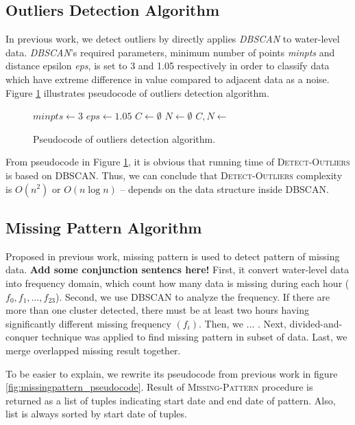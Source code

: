 \documentclass[conference]{IEEEtran}
\begin{document}
\subsection{Outliers Detection Algorithm}
In previous work, we detect outliers by directly applies \textit{DBSCAN} to water-level data. \textit{DBSCAN}'s required parameters, minimum number of points \textit{minpts} and distance epsilon \textit{eps}, is set to 3 and 1.05 respectively in order to classify data which have extreme difference in value compared to adjacent data as a noise. Figure \ref{fig:outliers_pseudocode} illustrates pseudocode of outliers detection algorithm.

\begin{figure}[H]
\begin{algorithmic}[1]
\State $minpts\gets3$
\State $eps\gets1.05 $
\State $C\gets\emptyset$
\State $N\gets\emptyset$
\State $C, N \gets $
\State {}
\EndProcedure
\end{algorithmic}
\caption{Pseudocode of outliers detection algorithm.}
\label{fig:outliers_pseudocode}
\end{figure}

From pseudocode in Figure \ref{fig:outliers_pseudocode}, it is obvious that running time of \textsc{Detect-Outliers} is based on \textsc{DBSCAN}. Thus, we can conclude that \textsc{Detect-Outliers} complexity is $O(n^2)$ or $O(n\log{n})$ -- depends on the data structure inside \textsc{DBSCAN}.

\subsection{Missing Pattern Algorithm}

Proposed in previous work, missing pattern is used to detect pattern of missing data. \textbf{\color{red}Add some conjunction sentencs here!} First, it convert water-level data into frequency domain, which count how many data is missing during each hour ($f_{0} ,f_{1}, \ldots, f_{23}$). Second, we use DBSCAN to analyze the frequency. If there are more than one cluster detected, there must be at least two hours having significantly different missing frequency $(f_{i})$. Then, we ... . Next, divided-and-conquer technique was applied to find missing pattern in subset of data. Last, we merge overlapped missing result together.

To be easier to explain, we rewrite its pseudocode from previous work in figure \ref{fig:missingpattern_pseudocode}. Result of \textsc{Missing-Pattern} procedure is returned as a list of tuples indicating start date and end date of pattern. Also, list is always sorted by start date of tuples.
\end{document}
